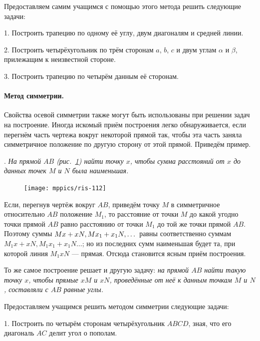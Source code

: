 \documentclass[oneside]{book}
\begin{document}
Предоставляем самим учащимся с помощью этого метода решить следующие задачи:

\medskip

1.
Построить трапецию по одному её углу, двум диагоналям и средней линии.

2.
Построить четырёхугольник по трём сторонам $a$, $b$, $c$ и двум углам $\alpha$ и $\beta$, прилежащим к неизвестной стороне.

3.
Построить трапецию по четырём данным её сторонам.


\paragraph{Метод симметрии.}\label{1938/102}
Свойства осевой симметрии также могут быть использованы при решении задач на построение.
Иногда искомый приём построения легко обнаруживается, если перегнём часть чертежа вокруг некоторой прямой так, чтобы эта часть заняла симметричное положение по другую сторону от этой прямой.
Приведём пример.

.
\emph{На прямой $AB$ \emph{(рис.~\ref{1938/ris-112})} найти точку $x$, чтобы сумма расстояний от $x$ до данных точек $M$ и $N$ была наименьшая.}

\begin{figure}
\centering
\texttt{[image: mppics/ris-112]}
\caption{}\label{1938/ris-112}
\end{figure}

Если, перегнув чертёж вокруг $AB$, приведём точку $M$ в симметричное относительно $AB$ положение $M_1$, то расстояние от точки $M$ до какой угодно точки прямой $AB$ равно расстоянию от точки $M_1$ до той же точки прямой $AB$.
Поэтому суммы $Mx+xN,  Mx_1\z+x_1N,\dots $ равны соответственно суммам $M_1x+xN, M_1x_1+x_1N \dots$;
но из последних сумм наименьшая будет та, при которой линия $M_1xN$ — прямая.
Отсюда становится ясным приём построения.

То же самое построение решает и другую задачу:
\emph{на прямой $AB$ найти такую точку $x$, чтобы прямые $xM$ и $xN$, проведённые от неё к данным точкам $M$ и $N$, составляли с $AB$ равные углы.}

Предоставляем учащимся решить методом симметрии следующие задачи:

\medskip

1.
Построить по четырём сторонам четырёхугольник $ABCD$, зная, что его диагональ $AC$ делит угол о пополам.
\end{document}
